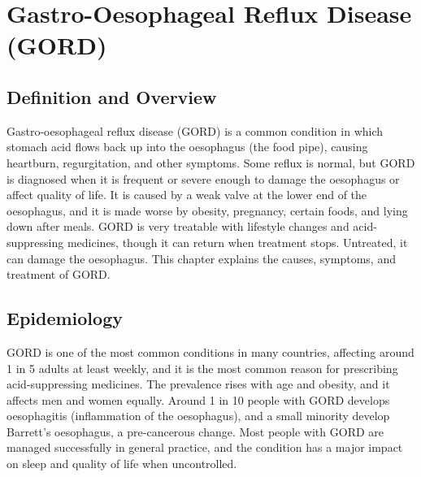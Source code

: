 \chapter{Gastro-Oesophageal Reflux Disease (GORD)}

\section*{Definition and Overview}
Gastro-oesophageal reflux disease (GORD) is a common condition in which stomach acid flows back up into the oesophagus (the food pipe), causing heartburn, regurgitation, and other symptoms. Some reflux is normal, but GORD is diagnosed when it is frequent or severe enough to damage the oesophagus or affect quality of life. It is caused by a weak valve at the lower end of the oesophagus, and it is made worse by obesity, pregnancy, certain foods, and lying down after meals. GORD is very treatable with lifestyle changes and acid-suppressing medicines, though it can return when treatment stops. Untreated, it can damage the oesophagus. This chapter explains the causes, symptoms, and treatment of GORD.

\section*{Epidemiology}
GORD is one of the most common conditions in many countries, affecting around 1 in 5 adults at least weekly, and it is the most common reason for prescribing acid-suppressing medicines. The prevalence rises with age and obesity, and it affects men and women equally. Around 1 in 10 people with GORD develops oesophagitis (inflammation of the oesophagus), and a small minority develop Barrett's oesophagus, a pre-cancerous change. Most people with GORD are managed successfully in general practice, and the condition has a major impact on sleep and quality of life when uncontrolled.

